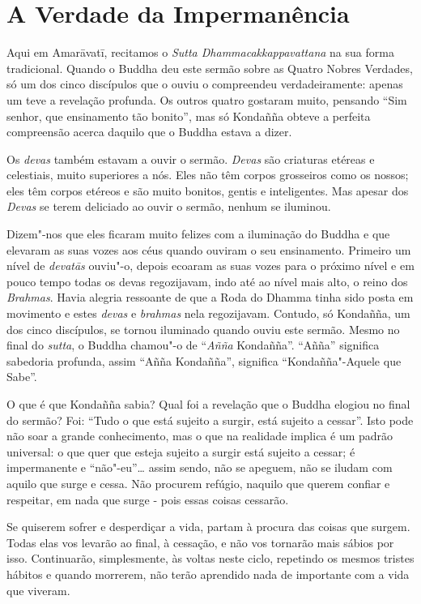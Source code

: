 \section{A Verdade da Impermanência}

Aqui em Amarāvatī, recitamos o \emph{Sutta Dhammacakkappavattana} na sua forma
tradicional. Quando o Buddha deu este sermão sobre as Quatro Nobres Verdades, só
um dos cinco discípulos que o ouviu o compreendeu verdadeiramente: apenas um
teve a revelação profunda. Os outros quatro gostaram muito, pensando “Sim
senhor, que ensinamento tão bonito”, mas só Kondañña obteve a perfeita
compreensão acerca daquilo que o Buddha estava a dizer.

Os \emph{devas} também estavam a ouvir o sermão. \emph{Devas} são criaturas
etéreas e celestiais, muito superiores a nós. Eles não têm corpos grosseiros
como os nossos; eles têm corpos etéreos e são muito bonitos, gentis e
inteligentes. Mas apesar dos \emph{Devas} se terem deliciado ao ouvir o sermão,
nenhum se iluminou.

Dizem"-nos que eles ficaram muito felizes com a iluminação do Buddha e que
elevaram as suas vozes aos céus quando ouviram o seu ensinamento. Primeiro um nível de \emph{devatās} ouviu"-o, depois ecoaram as suas vozes para o próximo nível e em pouco tempo todas os devas regozijavam, indo até ao nível mais alto, o reino dos
\emph{Brahmas}. Havia alegria ressoante de que a Roda do Dhamma tinha sido posta
em movimento e estes \emph{devas} e \emph{brahmas} nela regozijavam. Contudo, só
Kondañña, um dos cinco discípulos, se tornou iluminado quando ouviu este sermão.
Mesmo no final do \emph{sutta}, o Buddha chamou"-o de “\emph{Añña} Kondañña”.
“Añña” significa sabedoria profunda, assim “Añña Kondañña”, significa
“Kondañña"-Aquele que Sabe”.

O que é que Kondañña sabia? Qual foi a revelação que o Buddha elogiou no final
do sermão? Foi: “Tudo o que está sujeito a surgir, está sujeito a cessar”. Isto
pode não soar a grande conhecimento, mas o que na realidade implica é um padrão
universal: o que quer que esteja sujeito a surgir está sujeito a cessar; é
impermanente e “não"-eu”\ldots{} assim sendo, não se apeguem, não se iludam com
aquilo que surge e cessa. Não procurem refúgio, naquilo que querem confiar e
respeitar, em nada que surge - pois essas coisas cessarão.

Se quiserem sofrer e desperdiçar a vida, partam à procura das coisas que surgem.
Todas elas vos levarão ao final, à cessação, e não vos tornarão mais sábios por
isso. Continuarão, simplesmente, às voltas neste ciclo, repetindo os mesmos
tristes hábitos e quando morrerem, não terão aprendido nada de importante com a
vida que viveram.


